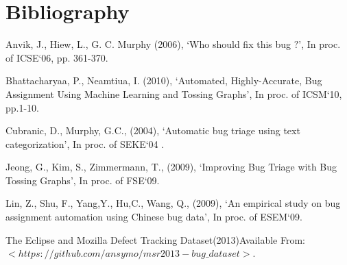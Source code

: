 \chapter{Bibliography}
\begin{thebibliography}{99}
 

 Anvik, J., Hiew, L., G. C. Murphy (2006), `Who should fix this bug $?$', In proc. of ICSE`06, 
pp. 361-370.

 Bhattacharyaa, P., Neamtiua, I. (2010), `Automated, Highly-Accurate, Bug Assignment Using Machine Learning and Tossing Graphs',  In proc. of ICSM`10, pp.1-10.

 Cubranic, D., Murphy, G.C., (2004), `Automatic bug triage using text categorization', In proc. of SEKE`04 .

 Jeong, G., Kim, S., Zimmermann, T.,  (2009), `Improving Bug Triage with Bug Tossing Graphs', In proc. of FSE`09.

 Lin, Z., Shu, F., Yang,Y., Hu,C., Wang, Q., (2009), `An empirical study on bug
assignment automation using Chinese bug data', In proc. of ESEM`09.

 The Eclipse and Mozilla Defect Tracking Dataset(2013)\newline Available From: $<https://github.com/ansymo/msr2013-bug\_dataset>$.


\end{thebibliography}
